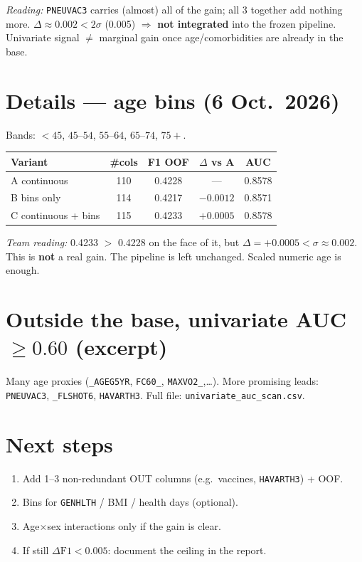 \documentclass[11pt,a4paper]{article}
\begin{document}
\noindent\textit{Reading:} \texttt{PNEUVAC3} carries (almost) all of the gain; all 3 together
add nothing more. $\Delta\approx0.002 < 2\sigma$ (0.005) $\Rightarrow$
\textbf{not integrated} into the frozen pipeline. Univariate signal $\neq$ marginal gain
once age/comorbidities are already in the base.

\section{Details --- age bins (6 Oct.\ 2026)}
Bands: $<45$, $45$--$54$, $55$--$64$, $65$--$74$, $75+$.

\begin{center}
\begin{tabular}{@{}lcccc@{}}
\toprule
Variant & \#cols & F1 OOF & $\Delta$ vs A & AUC \\
\midrule
A continuous & 110 & 0.4228 & --- & 0.8578 \\
B bins only & 114 & 0.4217 & $-0.0012$ & 0.8571 \\
C continuous + bins & 115 & 0.4233 & $+0.0005$ & 0.8578 \\
\bottomrule
\end{tabular}
\end{center}

\noindent\textit{Team reading:} 0.4233 $>$ 0.4228 on the face of it, but
$\Delta=+0.0005 < \sigma\approx0.002$. This is \textbf{not} a real gain.
The pipeline is left unchanged. Scaled numeric age is enough.

\section{Outside the base, univariate AUC $\ge 0.60$ (excerpt)}
Many age proxies (\texttt{\_AGEG5YR}, \texttt{FC60\_}, \texttt{MAXVO2\_},\ldots).
More promising leads: \texttt{PNEUVAC3}, \texttt{\_FLSHOT6}, \texttt{HAVARTH3}.
Full file: \texttt{univariate\_auc\_scan.csv}.

\section{Next steps}
\begin{enumerate}
  \item Add 1--3 non-redundant OUT columns (e.g.\ vaccines, \texttt{HAVARTH3}) + OOF.
  \item Bins for \texttt{GENHLTH} / BMI / health days (optional).
  \item Age$\times$sex interactions only if the gain is clear.
  \item If still $\Delta\mathrm{F1}<0.005$: document the ceiling in the report.
\end{enumerate}
\end{document}
